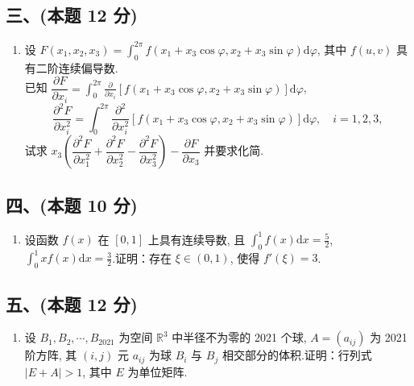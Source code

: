 \subsection*{三、(本题 12 分)}
\begin{enumerate}[start=7]
    \item 设 $F(x_1, x_2, x_3) = \displaystyle\int_{0}^{2\pi} f(x_1 + x_3 \cos \varphi, x_2 + x_3 \sin \varphi) \mathrm{d}\varphi$, 其中 $f(u, v)$ 具有二阶连续偏导数.\\
          已知
          $\dfrac{\partial F}{\partial x_i} = \displaystyle\int_{0}^{2\pi} \frac{\partial}{\partial x_i} [f(x_1 + x_3 \cos \varphi, x_2 + x_3 \sin \varphi)] \mathrm{d}\varphi$,
          \[
              \frac{\partial^2 F}{\partial x_i^2} = \int_{0}^{2\pi} \frac{\partial^2}{\partial x_i^2} [f(x_1 + x_3 \cos \varphi, x_2 + x_3 \sin \varphi)] \mathrm{d}\varphi, \quad i = 1, 2, 3,
          \]
          试求 $x_3 \left( \dfrac{\partial^2 F}{\partial x_1^2} + \dfrac{\partial^2 F}{\partial x_2^2} - \dfrac{\partial^2 F}{\partial x_3^2} \right) - \dfrac{\partial F}{\partial x_3}$ 并要求化简.
\end{enumerate}

\subsection*{四、(本题 10 分)}
\begin{enumerate}[start=8]
    \item 设函数 $f(x)$ 在 $[0, 1]$ 上具有连续导数, 且 $\displaystyle\int_{0}^{1} f(x) \mathrm{d}x = \frac{5}{2}$, $\displaystyle\int_{0}^{1} x f(x) \mathrm{d}x = \frac{3}{2}$.证明：存在 $\xi \in (0, 1)$, 使得 $f'(\xi) = 3$.
\end{enumerate}

\subsection*{五、(本题 12 分)}
\begin{enumerate}[start=9]
    \item 设 $B_1, B_2, \cdots, B_{2021}$ 为空间 $\mathbb{R}^3$ 中半径不为零的 2021 个球, $A = (a_{ij})$ 为 2021 阶方阵, 其 $(i, j)$ 元 $a_{ij}$ 为球 $B_i$ 与 $B_j$ 相交部分的体积.证明：行列式 $|E + A| > 1$, 其中 $E$ 为单位矩阵.
\end{enumerate}

